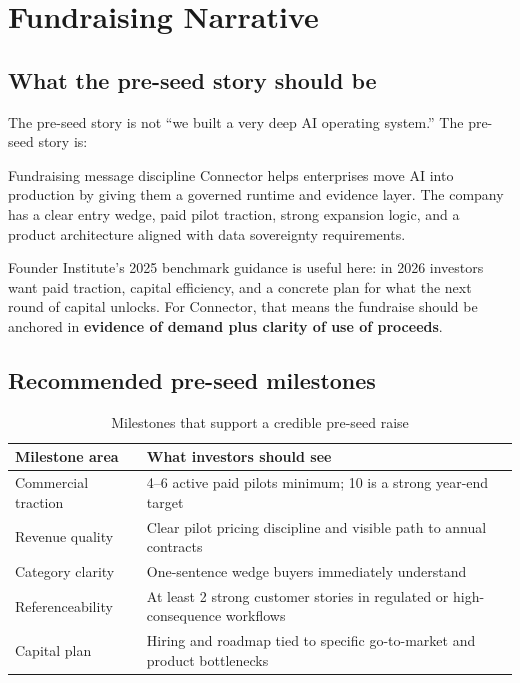 \section{Fundraising Narrative}

\subsection{What the pre-seed story should be}

The pre-seed story is not ``we built a very deep AI operating system.'' The
pre-seed story is:

\begin{warnbox}{Fundraising message discipline}
Connector helps enterprises move AI into production by giving them a governed
runtime and evidence layer. The company has a clear entry wedge, paid pilot
traction, strong expansion logic, and a product architecture aligned with data
sovereignty requirements.
\end{warnbox}

Founder Institute's 2025 benchmark guidance is useful here: in 2026 investors
want paid traction, capital efficiency, and a concrete plan for what the next
round of capital unlocks. For Connector, that means the fundraise should be
anchored in \textbf{evidence of demand plus clarity of use of proceeds}.

\subsection{Recommended pre-seed milestones}

\begin{table}[H]
\centering
\renewcommand{\arraystretch}{1.45}
\begin{tabularx}{\textwidth}{@{}lX@{}}
\toprule
\textbf{Milestone area} & \textbf{What investors should see} \\
\midrule
Commercial traction & 4--6 active paid pilots minimum; 10 is a strong year-end target \\
Revenue quality & Clear pilot pricing discipline and visible path to annual contracts \\
Category clarity & One-sentence wedge buyers immediately understand \\
Referenceability & At least 2 strong customer stories in regulated or high-consequence workflows \\
Capital plan & Hiring and roadmap tied to specific go-to-market and product bottlenecks \\
\bottomrule
\end{tabularx}
\caption{Milestones that support a credible pre-seed raise}
\end{table}

